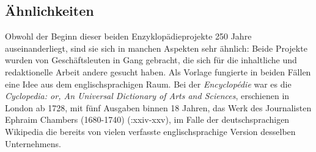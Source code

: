 \documentclass[fontsize=12pt]{scrartcl}
\begin{document}
\subsection{\"Ahnlichkeiten}
\label{subsec:4.1}
Obwohl der Beginn dieser beiden Enzyklop\"adieprojekte 250 Jahre auseinanderliegt, sind sie sich in manchen Aspekten sehr \"ahnlich: Beide Projekte wurden von Gesch\"aftsleuten in Gang gebracht, die sich f\"ur die inhaltliche und redaktionelle Arbeit andere gesucht haben. Als Vorlage fungierte in beiden F\"allen eine Idee aus dem eng\-lischspra\-chi\-gen Raum. Bei der \textit{Encyclop\'{e}die} war es die \textit{Cyclopedia: or, An Universal Dictionary of Arts and Sciences}, erschienen in London ab 1728, mit f\"unf Ausgaben binnen 18 Jahren, das Werk des Journalisten Ephraim Chambers (1680-1740) (\cite{Blom2004}:xxiv-xxv), im Falle der deutschspra\-chi\-gen Wi\-ki\-pe\-dia die bereits von vielen verfasste eng\-lischspra\-chi\-ge Version desselben Unternehmens. 
\end{document}
